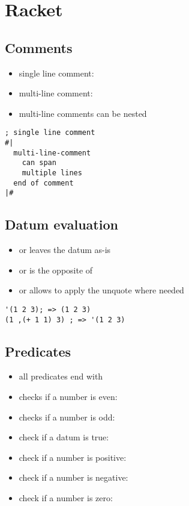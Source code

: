 \documentclass[a4paper,landscape,10pt]{article}
\begin{document}
\section{Racket}
\begin{multicols*}{2}
  \subsection{Comments}

  \begin{itemize}
    \item single line comment: \iracket{;}
    \item multi-line comment: 
    \item multi-line comments can be nested
  \end{itemize}

  \begin{lstlisting}[language=Racket]
; single line comment
#|
  multi-line-comment
	can span
	multiple lines
  end of comment
|#
\end{lstlisting}

  \subsection{Datum evaluation}

  \begin{itemize}
    \item {} or  leaves the datum as-is
    \item {} or  is the opposite of 
    \item {} or  allows to apply the unquote where needed
  \end{itemize}

  \begin{lstlisting}[language=Racket]
'(1 2 3); => (1 2 3)
(1 ,(+ 1 1) 3) ; => '(1 2 3)
\end{lstlisting}

  \subsection{Predicates}

  \begin{itemize}
    \item all predicates end with 
    \item checks if a number is even: 
    \item checks if a number is odd: 
    \item check if a datum is true: 
    \item check if a number is positive: 
    \item check if a number is negative: 
    \item check if a number is zero: 
  \end{itemize}


\end{multicols*}
\end{document}
